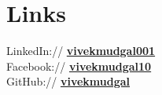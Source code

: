 \documentclass[letterpaper]{deedy-resume} %
\begin{document}
\begin{minipage}[t]{0.33\textwidth}
\sectionspace %

\section{Links} 

LinkedIn:// \href{https://www.linkedin.com/in/vivekmudgal001}{\bf vivekmudgal001} \\
Facebook:// \href{https://www.facebook.com/vivekmudgal10}{\bf vivekmudgal10}\\
GitHub:// \href{https://github.com/vivekmudgal}{\bf vivekmudgal}


\end{minipage} %
\hfill
%
%
\end{document}
